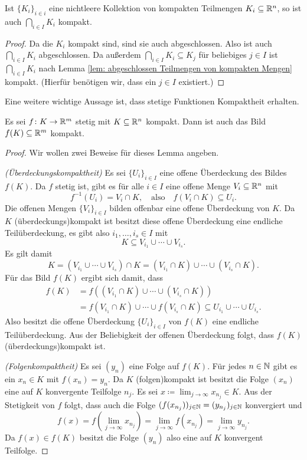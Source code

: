 \documentclass[a4paper,10pt]{article}
\begin{document}
\begin{kor}
 Ist $\{K_i\}_{i \in i}$ eine nichtleere Kollektion von kompakten Teilmengen $K_i \subseteq \mathbb{R}^n$, so ist auch $\bigcap_{i \in I} K_i$ kompakt.
\end{kor}
\begin{proof}
 Da die $K_i$ kompakt sind, sind sie auch abgeschlossen. Also ist auch $\bigcap_{i \in I} K_i$ abgeschlossen. Da außerdem $\bigcap_{i \in I} K_i \subseteq K_j$ für beliebiges $j \in I$ ist $\bigcap_{i \in I} K_i$ nach Lemma \ref{lem: abgeschlossen Teilmengen von kompakten Mengen} kompakt. (Hierfür benötigen wir, dass ein $j \in I$ existiert.)
\end{proof}


Eine weitere wichtige Aussage ist, dass stetige Funktionen Kompaktheit erhalten.


\begin{lem}
 Es sei $f \colon K \to \mathbb{R}^m$ stetig mit $K \subseteq \mathbb{R}^n$ kompakt. Dann ist auch das Bild $f(K) \subseteq \mathbb{R}^m$ kompakt.
\end{lem}
\begin{proof}
 Wir wollen zwei Beweise für dieses Lemma angeben.
 
 \emph{(Überdeckungskompaktheit)} Es sei $\{U_i\}_{i \in I}$ eine offene Überdeckung des Bildes $f(K)$. Da $f$ stetig ist, gibt es für alle $i \in I$ eine offene Menge $V_i \subseteq \mathbb{R}^n$ mit
 \[
  f^{-1}(U_i) = V_i \cap K,
  \quad
  \text{also}
  \quad
  f(V_i \cap K) \subseteq U_i.
 \]
 Die offenen Mengen $\{V_i\}_{i \in I}$ bilden offenbar eine offene Überdeckung von $K$. Da $K$ (überdeckungs)kompakt ist besitzt diese offene Überdeckung eine endliche Teilüberdeckung, es gibt also $i_1, \dotsc, i_s \in I$ mit
 \[
  K \subseteq V_{i_1} \cup \dotsb \cup V_{i_s}.
 \]
 Es gilt damit
 \[
  K
  = (V_{i_1} \cup \dotsb \cup V_{i_s}) \cap K
  = (V_{i_1} \cap K) \cup \dotsb \cup (V_{i_s} \cap K).
 \]
 Für das Bild $f(K)$ ergibt sich damit, dass
 \begin{align*}
  f(K)
  &= f((V_{i_1} \cap K) \cup \dotsb \cup (V_{i_s} \cap K)) \\
  &= f(V_{i_1} \cap K) \cup \dotsb \cup f(V_{i_s} \cap K)
  \subseteq U_{i_1} \cup \dotsb \cup U_{i_s}.
 \end{align*}
 Also besitzt die offene Überdeckung $\{U_i\}_{i \in I}$ von $f(K)$ eine endliche Teilüberdeckung. Aus der Beliebigkeit der offenen Überdeckung folgt, dass $f(K)$ (überdeckungs)kompakt ist.
 
 \emph{(Folgenkompaktheit)} Es sei $(y_n)$ eine Folge auf $f(K)$. Für jedes $n \in \mathbb{N}$ gibt es ein $x_n \in K$ mit $f(x_n) = y_n$. Da $K$ (folgen)kompakt ist besitzt die Folge $(x_n)$ eine auf $K$ konvergente Teilfolge $n_j$. Es sei $x \coloneqq \lim_{j \to \infty} x_{n_j} \in K$. Aus der Stetigkeit von $f$ folgt, dass auch die Folge $(f(x_{n_j}))_{j \in \mathbb{N}} = (y_{n_j})_{j \in \mathbb{N}}$ konvergiert und
 \[
  f(x)
  = f\left( \lim_{j \to \infty} x_{n_j} \right)
  = \lim_{j \to \infty} f(x_{n_j})
  = \lim_{j \to \infty} y_{n_j}.
 \]
 Da $f(x) \in f(K)$ besitzt die Folge $(y_n)$ also eine auf $K$ konvergent Teilfolge.
\end{proof}
\end{document}
